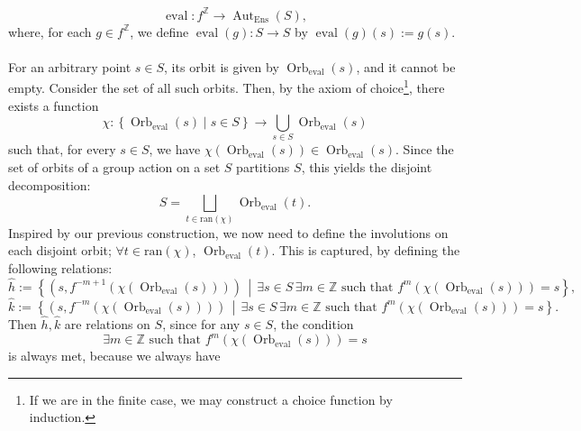\begin{solution}
    \[
        \operatorname{eval} : f^{\mathbb{Z}} \longrightarrow \operatorname{Aut}_{\mathrm{Ens}}\left(S\right),
    \]
    where, for each \( g \in f^{\mathbb{Z}} \), we define \( \operatorname{eval}\left(g\right) : S \rightarrow S \) by \( \operatorname{eval}\left(g\right)\left(s\right) := g\left(s\right) \).
    \\\\
    For an arbitrary point \( s \in S \), its orbit is given by \( \operatorname{Orb}_{\operatorname{eval}}\left(s\right) \), and it cannot be empty. Consider the set of all such orbits. Then, by the axiom of choice\footnote{If we are in the finite case, we may construct a choice function by induction.}, there exists a function
    \[
        \chi : \left\{ \operatorname{Orb}_{\operatorname{eval}}\left(s\right) \mid s \in S \right\} \longrightarrow \bigcup_{s \in S} \operatorname{Orb}_{\operatorname{eval}}\left(s\right)
    \]
    such that, for every \( s \in S \), we have \( \chi\left( \operatorname{Orb}_{\operatorname{eval}}\left(s\right) \right) \in \operatorname{Orb}_{\operatorname{eval}}\left(s\right) \). Since the set of orbits of a group action on a set \( S \) partitions \( S \), this yields the disjoint decomposition:
    \[
        S = \bigsqcup_{t \in \mathrm{ran}\left(\chi\right)} \operatorname{Orb}_{\operatorname{eval}}\left(t\right).
    \]
    Inspired by our previous construction, we now need to define the involutions on each disjoint orbit; \( \forall t \in \mathrm{ran}\left(\chi\right) \), \( \operatorname{Orb}_{\operatorname{eval}}\left(t\right) \). This is captured, by defining the following relations:
    \[
        \hat{h} := \left\{ \left( s, f^{-m+1}\left( \chi\left( \operatorname{Orb}_{\operatorname{eval}}\left( s \right) \right) \right) \right) \,\middle|\, \exists s \in S\,\exists m \in \mathbb{Z} \text{ such that } f^{m}\left( \chi\left( \operatorname{Orb}_{\operatorname{eval}}\left( s \right) \right) \right) = s \right\},
    \]
    \[
        \hat{k} := \left\{ \left( s, f^{-m}\left( \chi\left( \operatorname{Orb}_{\operatorname{eval}}\left( s \right) \right) \right) \right) \,\middle|\, \exists s \in S\,\exists m \in \mathbb{Z} \text{ such that } f^{m}\left( \chi\left( \operatorname{Orb}_{\operatorname{eval}}\left( s \right) \right) \right) = s \right\}.
    \]
    Then \( \hat{h}, \hat{k} \) are relations on \( S \), since for any \( s \in S \), the condition
    \[
        \exists m \in \mathbb{Z} \text{ such that } f^{m}\left( \chi\left( \operatorname{Orb}_{\operatorname{eval}}\left(s\right) \right) \right) = s
    \]
    is always met, because we always have

\end{solution}
